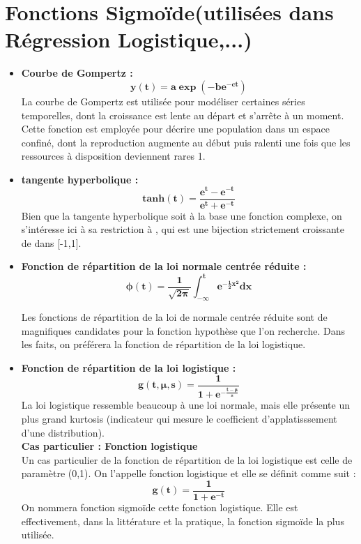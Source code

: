\documentclass[french]{article}
\begin{document}
	\section{Fonctions Sigmoïde(utilisées dans Régression Logistique,...)}
	\begin{itemize}[label=\textbullet, font=\LARGE \color{red}]
		\item \textbf{Courbe de Gompertz : }
			$$\bm{y(t)=a\exp(-be^{-ct})}$$
			La courbe de Gompertz est utilisée pour modéliser certaines séries temporelles, dont la
			croissance est lente au départ et s’arrête à un moment. Cette fonction est employée pour
			décrire une population dans un espace confiné, dont la reproduction augmente au début
			puis ralenti une fois que les ressources à disposition deviennent rares 1.
			
		\item \textbf{tangente hyperbolique :}
		$$\bm{tanh(t)=\frac{e^{t}-e^{-t}}{e^{t}+e^{-t}}}$$
		Bien que la tangente hyperbolique soit à la base une fonction complexe, on s’intéresse ici
		à sa restriction à , qui est une bijection strictement croissante de dans [-1,1].
		
		\item \textbf{Fonction de répartition de la loi normale centrée réduite :}
		$$\bm{\phi(t)=\frac{1}{\sqrt{2\pi}}\int^{t}_{-\infty}e^{-\frac{1}{2}x^{2}}dx}$$
		
	Les fonctions de répartition de la loi de normale centrée réduite sont de magnifiques
	candidates pour la fonction hypothèse que l’on recherche. Dans les faits, on préférera la
	fonction de répartition de la loi logistique.
	
	\item \textbf{Fonction de répartition de la loi logistique :}
	$$\bm{g(t,\mu,s)=\frac{1}{1+e^{-\frac{t-\mu}{s}}}}$$
	La loi logistique ressemble beaucoup à une loi normale, mais elle présente un plus grand
	kurtosis (indicateur qui mesure le coefficient d’applatisssement d’une distribution).\\
	
	\textbf{Cas particulier : Fonction logistique}\\
	Un cas particulier de la fonction de répartition de la loi logistique est celle de paramètre
	(0,1). On l’appelle fonction logistique et elle se définit comme suit : $$\bm{g(t)=\frac{1}{1+e^{-t}}}$$
	On nommera fonction sigmoïde cette fonction logistique. Elle est effectivement, dans la littérature et la pratique, la fonction sigmoïde la plus utilisée.
	\end{itemize}
	
\end{document}
